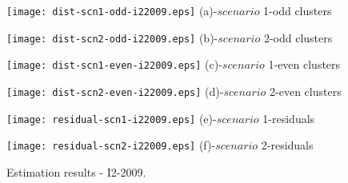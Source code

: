 \begin{figure}
     \begin{minipage}[h]{0.5\linewidth}
        \centering
        \texttt{[image: dist-scn1-odd-i22009.eps]}
				\footnotesize{(a)-$scenario$ 1-odd clusters}
     \end{minipage}
\vspace{3.00mm}
    \begin{minipage}[h]{0.5\linewidth}
       \centering
       \texttt{[image: dist-scn2-odd-i22009.eps]}
			\footnotesize{(b)-$scenario$ 2-odd clusters}
     \end{minipage}
\vspace{3.00mm}
    \begin{minipage}[h]{0.5\linewidth}
       \centering
       \texttt{[image: dist-scn1-even-i22009.eps]}
			\footnotesize{(c)-$scenario$ 1-even clusters}
     \end{minipage}
\vspace{3.00mm}
    \begin{minipage}[h]{0.5\linewidth}
       \centering
       \texttt{[image: dist-scn2-even-i22009.eps]}
			\footnotesize{(d)-$scenario$ 2-even clusters}
     \end{minipage}
\vspace{3.00mm}
    \begin{minipage}[h]{0.5\linewidth}
       \centering
       \texttt{[image: residual-scn1-i22009.eps]}
			\footnotesize{(e)-$scenario$ 1-residuals}
     \end{minipage}
\vspace{3.00mm}
    \begin{minipage}[h]{0.5\linewidth}
       \centering
       \texttt{[image: residual-scn2-i22009.eps]}
			\footnotesize{(f)-$scenario$ 2-residuals}
     \end{minipage}
		\caption{Estimation results - I2-2009.}
\label{fig9}
\end{figure}

